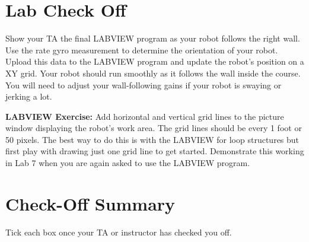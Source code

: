 \documentclass[11pt]{article}
\begin{document}
    \section*{Lab Check Off}
    \begin{checkoff}
            Show your TA the final LABVIEW program as your robot follows the right wall. Use the rate gyro measurement to determine the orientation of your robot. Upload this data to the LABVIEW program and update the robot’s position on a XY grid. Your robot should run smoothly as it follows the wall inside the course. You will need to adjust your wall-following gains if your robot is swaying or jerking a lot.
    \end{checkoff}
    \begin{checkoff}
            \textbf{LABVIEW Exercise:} Add horizontal and vertical grid lines to the picture window displaying the robot’s work area. The grid lines should be every 1 foot or 50 pixels. The best way to do this is with the LABVIEW for loop structures but first play with drawing just one grid line to get started. Demonstrate this working in Lab 7 when you are again asked to use the LABVIEW program.
    \end{checkoff}
    \section*{Check-Off Summary}

    Tick each box once your TA or instructor has checked you off.
    \CheckOffSummary

    \MakeFooter
    
\end{document}
